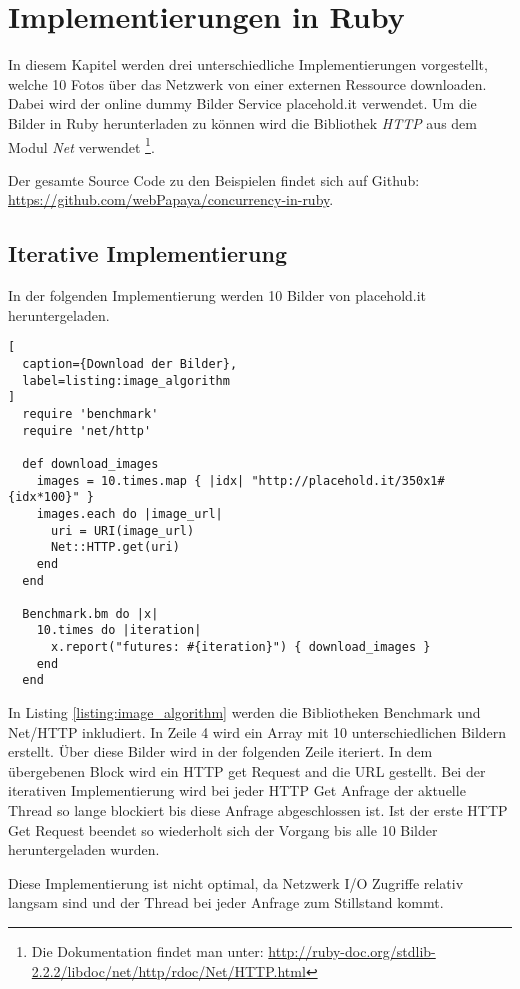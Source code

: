 \section{Implementierungen in Ruby}
\label{section:implementation}

In diesem Kapitel werden drei unterschiedliche Implementierungen vorgestellt, welche 10 Fotos über das Netzwerk von einer externen Ressource downloaden. Dabei wird der online dummy Bilder Service placehold.it verwendet. Um die Bilder in Ruby herunterladen zu können wird die Bibliothek \emph{HTTP} aus dem Modul \emph{Net} verwendet \footnote{Die Dokumentation findet man unter: \url{http://ruby-doc.org/stdlib-2.2.2/libdoc/net/http/rdoc/Net/HTTP.html}}.

Der gesamte Source Code zu den Beispielen findet sich auf Github: \url{https://github.com/webPapaya/concurrency-in-ruby}.


\subsection{Iterative Implementierung}

In der folgenden Implementierung werden 10 Bilder von placehold.it heruntergeladen.

\begin{lstlisting}[
  caption={Download der Bilder},
  label=listing:image_algorithm
]
  require 'benchmark'
  require 'net/http'

  def download_images
    images = 10.times.map { |idx| "http://placehold.it/350x1#{idx*100}" }
    images.each do |image_url|
      uri = URI(image_url)
      Net::HTTP.get(uri)
    end
  end

  Benchmark.bm do |x|
    10.times do |iteration|
      x.report("futures: #{iteration}") { download_images }
    end
  end
\end{lstlisting}

In Listing \ref{listing:image_algorithm} werden die Bibliotheken Benchmark und Net/HTTP inkludiert. In Zeile 4 wird ein Array mit 10 unterschiedlichen Bildern erstellt. Über diese Bilder wird in der folgenden Zeile iteriert.  In dem übergebenen Block wird ein HTTP get Request and die URL gestellt. Bei der iterativen Implementierung wird bei jeder HTTP Get Anfrage der aktuelle Thread so lange blockiert bis diese Anfrage abgeschlossen ist. Ist der erste HTTP Get Request beendet so wiederholt sich der Vorgang bis alle 10 Bilder heruntergeladen wurden. 

Diese Implementierung ist nicht optimal, da Netzwerk I/O Zugriffe relativ langsam sind und der Thread bei jeder Anfrage zum Stillstand kommt.

